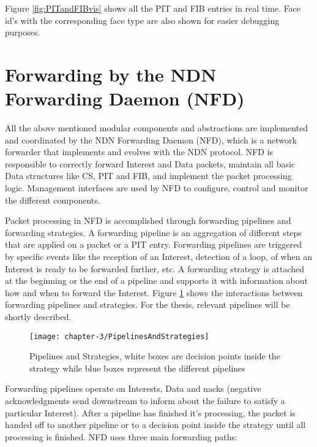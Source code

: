 Figure \ref{fig:PITandFIBvis} shows all the PIT and FIB entries in real time. Face id's with the corresponding face type are also shown for easier debugging purposes.

\section{Forwarding by the NDN Forwarding Daemon (NFD)}

\vspace{5mm} %

All the above mentioned modular components and abstractions are implemented and coordinated by the NDN Forwarding Daemon (NFD), which is a network forwarder that implements and evolves with the NDN protocol. NFD is responsible to correctly forward Interest and Data packets, maintain all basic Data structures like CS, PIT and FIB, and implement the packet processing logic. Management interfaces are used by NFD to configure, control and monitor the different components.

\vspace{5mm} %

Packet processing in NFD is accomplished through forwarding pipelines and forwarding strategies. A forwarding pipeline is an aggregation of different steps that are applied on a packet or a PIT entry. Forwarding pipelines are triggered by specific events like the reception of an Interest, detection of a loop, of when an Interest is ready to be forwarded further, etc. A forwarding strategy is attached at the beginning or the end of a pipeline and supports it with information about how and when to forward the Interest. Figure \ref{fig:PipelinesAndStrategies} shows the interactions between forwarding pipelines and strategies. For the thesis, relevant pipelines will be shortly described.

\vspace{5mm} %

\begin{figure}[H]
  \centering
  \texttt{[image: chapter-3/PipelinesAndStrategies]}
  \caption{Pipelines and Strategies, white boxes are decision points inside the strategy while blue boxes represent the different pipelines \cite{Afanasyev16}}
  \label{fig:PipelinesAndStrategies}
\end{figure}

\vspace{5mm} %

Forwarding pipelines operate on Interests, Data and nacks (negative acknowledgments send downstream to inform about the failure to satisfy a particular Interest). After a pipeline has finished it's processing, the packet is handed off to another pipeline or to a decision point inside the strategy until all processing is finished. NFD uses three main forwarding paths:

